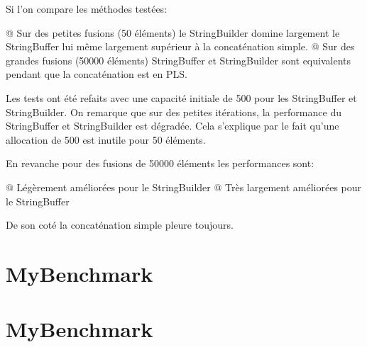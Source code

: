 \documentclass{report}
\begin{document}
				Si l'on compare les méthodes testées:
				\begin{easylist}
					@ Sur des petites fusions (50 éléments) le StringBuilder domine largement le StringBuffer lui même largement supérieur à la concaténation simple.
					@ Sur des grandes fusions (50000 éléments) StringBuffer et StringBuilder sont equivalents pendant que la concaténation est en PLS.
				\end{easylist}
				
				Les tests ont été refaits avec une capacité initiale de 500 pour les StringBuffer et StringBuilder.
				On remarque que sur des petites itérations, la performance du StringBuffer et StringBuilder est dégradée.
				Cela s'explique par le fait qu'une allocation de 500 est inutile pour 50 éléments.
				
				En revanche pour des fusions de 50000 éléments les performances sont:
				\begin{easylist}
					@ Légèrement améliorées pour le StringBuilder
					@ Très largement améliorées pour le StringBuffer
				\end{easylist}
				
				De son coté la concaténation simple pleure toujours.
				
\appendix
\chapter{MyBenchmark\label{sec:mybenchmark}}
	
	
\chapter{MyBenchmark\label{sec:mybenchmark2}}
	
	
	
	
	
			
\end{document}

